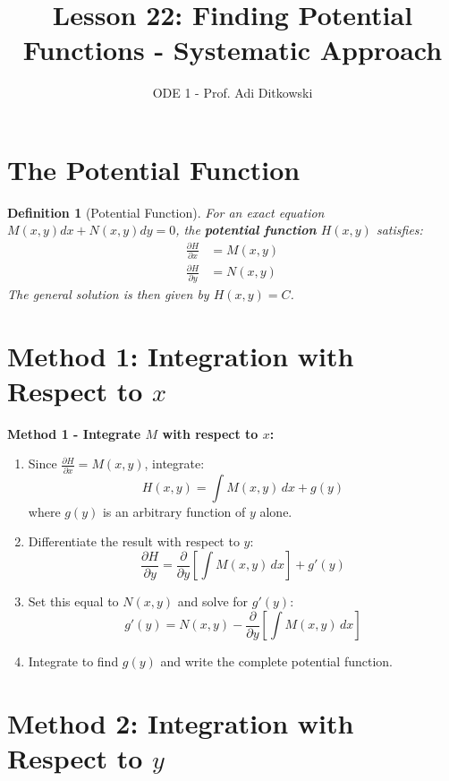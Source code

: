 \documentclass[12pt]{article}
\title{Lesson 22: Finding Potential Functions - Systematic Approach}
\author{ODE 1 - Prof. Adi Ditkowski}
\date{}
\newtheorem{definition}{Definition}
\begin{document}
\maketitle

\section{The Potential Function}

\begin{definition}[Potential Function]
For an exact equation $M(x,y)dx + N(x,y)dy = 0$, the \textbf{potential function} $H(x,y)$ satisfies:
\begin{align}
\frac{\partial H}{\partial x} &= M(x,y) \\
\frac{\partial H}{\partial y} &= N(x,y)
\end{align}
The general solution is then given by $H(x,y) = C$.
\end{definition}

\section{Method 1: Integration with Respect to $x$}

\begin{algorithm}
\textbf{Method 1 - Integrate $M$ with respect to $x$:}
\begin{enumerate}
    \item Since $\frac{\partial H}{\partial x} = M(x,y)$, integrate:
    \[H(x,y) = \int M(x,y)\,dx + g(y)\]
    where $g(y)$ is an arbitrary function of $y$ alone.

    \item Differentiate the result with respect to $y$:
    \[\frac{\partial H}{\partial y} = \frac{\partial}{\partial y}\left[\int M(x,y)\,dx\right] + g'(y)\]

    \item Set this equal to $N(x,y)$ and solve for $g'(y)$:
    \[g'(y) = N(x,y) - \frac{\partial}{\partial y}\left[\int M(x,y)\,dx\right]\]

    \item Integrate to find $g(y)$ and write the complete potential function.
\end{enumerate}
\end{algorithm}

\section{Method 2: Integration with Respect to $y$}
\end{document}
